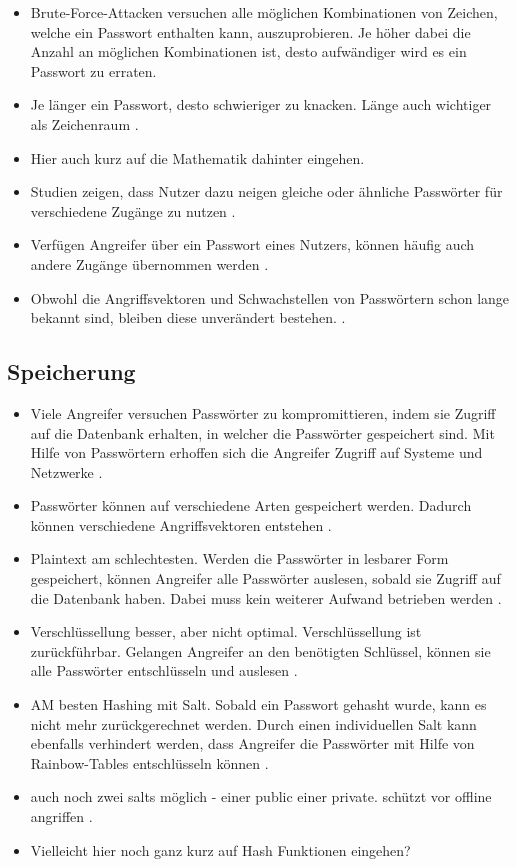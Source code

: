 \begin{itemize}
    \item Brute-Force-Attacken versuchen alle möglichen Kombinationen von Zeichen, welche ein Passwort enthalten kann, auszuprobieren. Je höher dabei die Anzahl an möglichen Kombinationen ist, desto aufwändiger wird es ein Passwort zu erraten.
    \item Je länger ein Passwort, desto schwieriger zu knacken. Länge auch wichtiger als Zeichenraum \cite{chanda2016password}.
    \item Hier auch kurz auf die Mathematik dahinter eingehen.
    \item Studien zeigen, dass Nutzer dazu neigen gleiche oder ähnliche Passwörter für verschiedene Zugänge zu nutzen \cite{chanda2016password} \cites{ives2004domino}.
    \item Verfügen Angreifer über ein Passwort eines Nutzers, können häufig auch andere Zugänge übernommen werden \cite{chanda2016password} \cite{morii2017research}.
    \item Obwohl die Angriffsvektoren und Schwachstellen von Passwörtern schon lange bekannt sind, bleiben diese unverändert bestehen. \cite{ives2004domino}.
\end{itemize}

\subsection{Speicherung}

\begin{itemize}
    \item Viele Angreifer versuchen Passwörter zu kompromittieren, indem sie Zugriff auf die Datenbank erhalten, in welcher die Passwörter gespeichert sind. Mit Hilfe von Passwörtern erhoffen sich die Angreifer Zugriff auf Systeme und Netzwerke \cite{boonkrong2012security}.
    \item Passwörter können auf verschiedene Arten gespeichert werden. Dadurch können verschiedene Angriffsvektoren entstehen \cite{chanda2016password}.
    \item Plaintext am schlechtesten. Werden die Passwörter in lesbarer Form gespeichert, können Angreifer alle Passwörter auslesen, sobald sie Zugriff auf die Datenbank haben. Dabei muss kein weiterer Aufwand betrieben werden \cite{chanda2016password}.
    \item Verschlüssellung besser, aber nicht optimal. Verschlüssellung ist zurückführbar. Gelangen Angreifer an den benötigten Schlüssel, können sie alle Passwörter entschlüsseln und auslesen \cite{chanda2016password}.
    \item AM besten Hashing mit Salt. Sobald ein Passwort gehasht wurde, kann es nicht mehr zurückgerechnet werden. Durch einen individuellen Salt kann ebenfalls verhindert werden, dass Angreifer die Passwörter mit Hilfe von Rainbow-Tables entschlüsseln können \cite{chanda2016password}.
    \item auch noch zwei salts möglich - einer public einer private. schützt vor offline angriffen \cite{chanda2016password}.
    \item Vielleicht hier noch ganz kurz auf Hash Funktionen eingehen?
\end{itemize}

